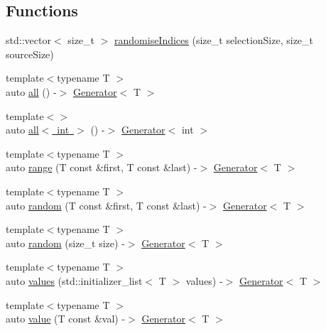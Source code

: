 \subsection*{Functions}
\begin{DoxyCompactItemize}
\item 
std\+::vector$<$ size\+\_\+t $>$ \mbox{\hyperlink{namespace_catch_1_1_generators_a4ee4b9f5df1ceedc8ffc6c31b5a7d68b}{randomise\+Indices}} (size\+\_\+t selection\+Size, size\+\_\+t source\+Size)
\item 
{\footnotesize template$<$typename T $>$ }\\auto \mbox{\hyperlink{namespace_catch_1_1_generators_a4f9b91d73905007d0e595ddde14c1c88}{all}} () -\/$>$ \mbox{\hyperlink{class_catch_1_1_generators_1_1_generator}{Generator}}$<$ T $>$
\item 
{\footnotesize template$<$$>$ }\\auto \mbox{\hyperlink{namespace_catch_1_1_generators_a45719d627af8d605990ee97722552f24}{all$<$ int $>$}} () -\/$>$ \mbox{\hyperlink{class_catch_1_1_generators_1_1_generator}{Generator}}$<$ int $>$
\item 
{\footnotesize template$<$typename T $>$ }\\auto \mbox{\hyperlink{namespace_catch_1_1_generators_acb1dc71e5494dbc60eb69a3136a5484c}{range}} (T const \&first, T const \&last) -\/$>$ \mbox{\hyperlink{class_catch_1_1_generators_1_1_generator}{Generator}}$<$ T $>$
\item 
{\footnotesize template$<$typename T $>$ }\\auto \mbox{\hyperlink{namespace_catch_1_1_generators_a13afd4c586149e2c76bfb26396cb4b96}{random}} (T const \&first, T const \&last) -\/$>$ \mbox{\hyperlink{class_catch_1_1_generators_1_1_generator}{Generator}}$<$ T $>$
\item 
{\footnotesize template$<$typename T $>$ }\\auto \mbox{\hyperlink{namespace_catch_1_1_generators_a81f960beb999d6ebc1d50036122b8ee0}{random}} (size\+\_\+t size) -\/$>$ \mbox{\hyperlink{class_catch_1_1_generators_1_1_generator}{Generator}}$<$ T $>$
\item 
{\footnotesize template$<$typename T $>$ }\\auto \mbox{\hyperlink{namespace_catch_1_1_generators_abd89db7c0024d0ea5715a3cd6336214c}{values}} (std\+::initializer\+\_\+list$<$ T $>$ values) -\/$>$ \mbox{\hyperlink{class_catch_1_1_generators_1_1_generator}{Generator}}$<$ T $>$
\item 
{\footnotesize template$<$typename T $>$ }\\auto \mbox{\hyperlink{namespace_catch_1_1_generators_a13dbed5ff32f2363862c8ff26661e0ae}{value}} (T const \&val) -\/$>$ \mbox{\hyperlink{class_catch_1_1_generators_1_1_generator}{Generator}}$<$ T $>$

\end{DoxyCompactItemize}
